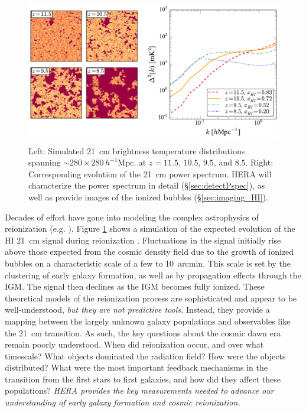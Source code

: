 \documentclass[preprint]{aastex}
\begin{document}
\begin{figure}[t]\centering
\includegraphics[height=2.5in]{plots/cubes/cubesAndPspecs.pdf}
\caption{\small 
Left: Simulated 21~cm brightness temperature distributions spanning $\sim 280 \times 280\,h^{-1}\textrm{Mpc}$.
at $z=11.5$, $10.5$, $9.5$, and $8.5$.
Right: Corresponding evolution of the 21~cm power spectrum.  HERA
will characterize the power spectrum in detail (\S\ref{sec:detectPspec}), as well as
provide images of the ionized bubbles (\S\ref{sec:imaging_HI}).
}\label{fig:EoRsims} \end{figure}

Decades of effort have gone into modeling the complex astrophysics of reionization
(e.g. \citealt{shapiro_giroux1987, haiman_loeb1997, furlanetto_et_al2004, santos_et_al2010}). Figure \ref{fig:EoRsims} shows a 
simulation of the expected evolution of the HI 21~cm signal during reionization \citep{mesinger_furlanetto2007}. Fluctuations in the signal initially 
rise above those expected from the cosmic density field due to the growth of ionized bubbles on a characteristic 
scale of a few to 10~arcmin. This scale is set by the clustering of early galaxy formation, as well as by 
propagation effects through the IGM. The signal then declines as the IGM becomes fully ionized.  These theoretical 
models of the reionization process are sophisticated and appear to be well-understood, {\it but they are not 
predictive tools.} Instead, they provide a mapping between the largely unknown galaxy populations and observables 
like the 21~cm transition. As such, the key questions about the cosmic dawn era remain poorly understood.  When 
did reionization occur, and over what timescale?  What objects dominated the radiation field?  How were the 
objects distributed?  What were the most important feedback mechanisms in the transition from the first stars to
first galaxies, and how did they affect these populations?  {\it HERA provides the key measurements needed 
to advance our understanding of early galaxy formation and cosmic reionization.}
\end{document}
